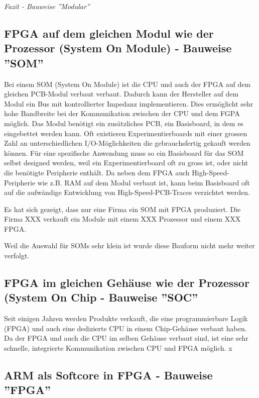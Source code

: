 \textit{Fazit - Bauweise ''Modular''}

\subsection{FPGA auf dem gleichen Modul wie der Prozessor (System On Module) - Bauweise ''SOM''}
Bei einem SOM (System On Module) ist die CPU und auch der FPGA auf dem gleichen PCB-Modul verbaut verbaut.
Dadurch kann der Hersteller auf dem Modul ein Bus mit kontrollierter Impedanz implementieren.
Dies ermöglicht sehr hohe Bandbreite bei der Kommunikation zwischen der CPU und dem FGPA möglich.
Das Modul benötigt ein zusätzliches PCB, ein Basisboard, in dem es eingebettet werden kann.
Oft existieren Experimentierboards mit einer grossen Zahl an unterschiedlichen I/O-Möglichkeiten die gebrauchsfertig gekauft werden können.
Für eine spezifische Anwendung muss so ein Basisboard für das SOM selbst designed werden, weil ein Experimentierboard oft zu gross ist, oder nicht die benötigte Peripherie enthält.
Da neben dem FPGA auch High-Speed-Peripherie wie z.B. RAM auf dem Modul verbaut ist, kann beim Basisboard oft auf die aufwändige Entwicklung von High-Speed-PCB-Traces verzichtet werden.

Es hat sich gezeigt, dass nur eine Firma ein SOM mit FPGA produziert.
Die Firma XXX verkauft ein Module mit einem XXX Prozessor und einem XXX FPGA.


Weil die Auswahl für SOMs sehr klein ist wurde diese Bauform nicht mehr weiter verfolgt.

 
\subsection{FPGA im gleichen Gehäuse wie der Prozessor (System On Chip - Bauweise ''SOC''}
Seit einigen Jahren werden Produkte verkauft, die eine programmierbare Logik (FPGA) und auch eine dedizierte CPU in einem Chip-Gehäuse verbaut haben.
Da der FPGA und auch die CPU im selben Gehäuse verbaut sind, ist eine sehr schnelle, integrierte Kommunikation zwischen CPU und FPGA möglich.
x

\subsection{ARM als Softcore in FPGA - Bauweise ''FPGA''}

